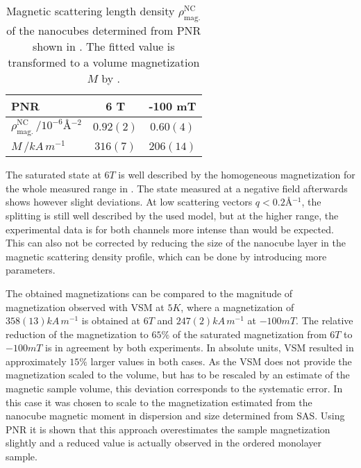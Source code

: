 \documentclass[\main/dresen_thesis.tex]{subfiles}
\begin{document}
  \begin{table}[!htbp]
    \centering
    \caption{\label{tab:monolayers:magneticStructure:pnrResult}Magnetic scattering length density $\rho_\mathrm{mag.}^\mathrm{NC}$ of the nanocubes determined from PNR shown in . The fitted value is transformed to a volume magnetization $M$ by .}
    \begin{tabular}{l | c | c}
      \hline
      PNR & \textbf{6 T} & \textbf{-100 mT}\\
      \hline
      $\rho_\mathrm{mag.}^\mathrm{NC}\, / \unit{10^{-6} \angstrom^{-2}}$ & $0.92(2)$  & $0.60(4)$  \\
      \hline
      $M \, / \unit{kA \, m^{-1}}$                                       & $316(7)$   & $206(14)$  \\
      \hline
      \end{tabular}
  \end{table}

  The saturated state at $6 \unit{T}$ is well described by the homogeneous magnetization for the whole measured range in .
  The state measured at a negative field afterwards shows however slight deviations.
  At low scattering vectors $q < 0.2 \unit{\angstrom^{-1}}$, the splitting is still well described by the used model, but at the higher range, the experimental data is for both channels more intense than would be expected.
  This can also not be corrected by reducing the size of the nanocube layer in the magnetic scattering density profile, which can be done by introducing more parameters.

  The obtained magnetizations can be compared to the magnitude of magnetization observed with VSM at $5 \unit{K}$, where a magnetization of $358(13) \unit{kA \, m^{-1}}$ is obtained at $6 \unit{T}$ and $247(2) \unit{kA \, m^{-1}}$ at $-100 \unit{mT}$.
  The relative reduction of the magnetization to $65 \%$ of the saturated magnetization from $6 \unit{T}$ to $-100 \unit{mT}$ is in agreement by both experiments.
  In absolute units, VSM resulted in approximately $15 \%$ larger values in both cases.
  As the VSM does not provide the magnetization scaled to the volume, but has to be rescaled by an estimate of the magnetic sample volume, this deviation corresponds to the systematic error.
  In this case it was chosen to scale to the magnetization estimated from the nanocube magnetic moment in dispersion and size determined from SAS.
  Using PNR it is shown that this approach overestimates the sample magnetization slightly and a reduced value is actually observed in the ordered monolayer sample.
\end{document}
